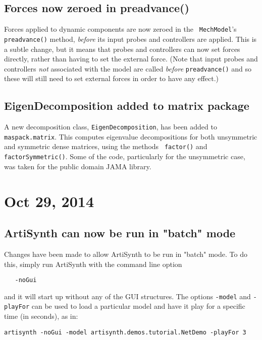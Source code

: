 \documentclass{article}
\begin{document}
\subsection*{Forces now zeroed in preadvance()}

Forces applied to dynamic components are now zeroed in the {\tt
MechModel}'s {\tt preadvance()} method, {\it before} its input probes
and controllers are applied. This is a subtle change, but it means
that probes and controllers can now set forces directly, rather than
having to set the external force. (Note that input probes and
controllers {\it not} associated with the model are called {\it
before} {\tt preadvance()} and so these will still
need to set external forces in order to have any effect.)

\subsection*{EigenDecomposition added to matrix package}

A new decomposition class, {\tt EigenDecomposition}, has been added to
{\tt maspack.matrix}. This computes eigenvalue decompositions for both
unsymmetric and symmetric dense matrices, using the methods {\tt
factor()} and {\tt factorSymmetric()}. Some of the code, particularly
for the unsymmetric case, was taken for the public domain JAMA
library.

\section*{Oct 29, 2014}

\subsection*{ArtiSynth can now be run in "batch" mode}

Changes have been made to allow ArtiSynth to be run in "batch" mode.
To do this, simply run ArtiSynth with the command line option
%
\begin{verbatim}
   -noGui
\end{verbatim}
%
and it will start up without any of the GUI structures.  The options
{\tt -model} and {\tt -playFor} can be used to load a particular model
and have it play for a specific time (in seconds), as in:
%
\begin{lstlisting}[]
   artisynth -noGui -model artisynth.demos.tutorial.NetDemo -playFor 3
\end{lstlisting}
%
\end{document}

